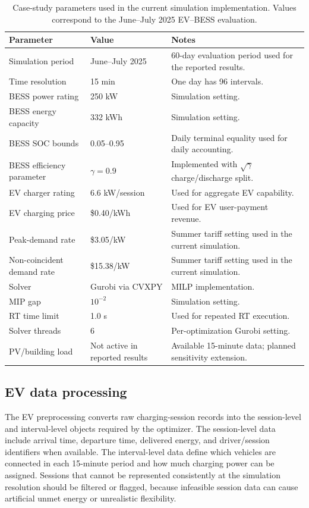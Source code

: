 \documentclass[final,5p,times]{elsarticle}
\begin{document}
\begin{table}[!t]
\centering
\caption{Case-study parameters used in the current simulation implementation. Values correspond to the June--July 2025 EV--BESS evaluation.}
\label{tab:case_parameters}
\scriptsize
\begin{tabularx}{\textwidth}{@{}p{}p{}X@{}}
\toprule
Parameter & Value & Notes \\
\midrule
Simulation period & June--July 2025 & 60-day evaluation period used for the reported results.\\
Time resolution & 15 min & One day has 96 intervals.\\
BESS power rating & 250 kW & Simulation setting.\\
BESS energy capacity & 332 kWh & Simulation setting.\\
BESS SOC bounds & 0.05--0.95 & Daily terminal equality used for daily accounting.\\
BESS efficiency parameter & $\gamma=0.9$ & Implemented with $\sqrt{\gamma}$ charge/discharge split.\\
EV charger rating & 6.6 kW/session & Used for aggregate EV capability.\\
EV charging price & \$0.40/kWh & Used for EV user-payment revenue.\\
Peak-demand rate & \$3.05/kW & Summer tariff setting used in the current simulation.\\
Non-coincident demand rate & \$15.38/kW & Summer tariff setting used in the current simulation.\\
Solver & Gurobi via CVXPY & MILP implementation.\\
MIP gap & $10^{-2}$ & Simulation setting.\\
RT time limit & 1.0 s & Used for repeated RT execution.\\
Solver threads & 6 & Per-optimization Gurobi setting.\\
PV/building load & Not active in reported results & Available 15-minute data; planned sensitivity extension.\\
\bottomrule
\end{tabularx}
\end{table}

\subsection{EV data processing}
The EV preprocessing converts raw charging-session records into the session-level and interval-level objects required by the optimizer. The session-level data include arrival time, departure time, delivered energy, and driver/session identifiers when available. The interval-level data define which vehicles are connected in each 15-minute period and how much charging power can be assigned. Sessions that cannot be represented consistently at the simulation resolution should be filtered or flagged, because infeasible session data can cause artificial unmet energy or unrealistic flexibility.
\end{document}
